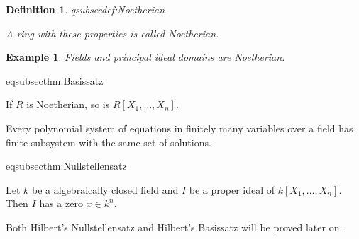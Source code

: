 \documentclass[DIV=14,parskip=full,pointednumbers]{scrartcl}
\theoremstyle{cthm}
\theoremstyle{cvarthm}
\theoremstyle{cdef}
\newtheorem{defi}{Definition}[subsection]
\newtheorem{example}{Example}[subsection]
\newcommand{\lbl}[1]{
	\label{#1}
	\ifmmode
	\expandafter\xdef\csname eqsubsec#1\endcsname{\thesubsection}
	\fi
}
\begin{document}
	
	\begin{defi}\lbl{def:Noetherian}
		A ring with these properties is called \emph{Noetherian}.
	\end{defi}
	\begin{example}
		Fields and principal ideal domains are Noetherian. 
	\end{example}
	\begin{thm}\lbl{thm:Basissatz}
		If $R$ is Noetherian, so is $R[X_1,\ldots,X_n]$.
	\end{thm}
	\begin{cor}
		Every polynomial system of equations in finitely many variables over a field has finite subsystem with the same set of solutions.
	\end{cor}
	\begin{thm} \lbl{thm:Nullstellensatz}
		Let $k$ be a algebraically closed field and $I$ be a proper ideal of $k[X_1,\ldots,X_n]$. Then $I$ has a zero $x\in k^n$.
	\end{thm}
	Both Hilbert's Nullstellensatz and Hilbert's Basissatz will be proved later on.
\end{document}
